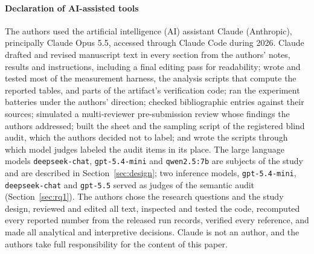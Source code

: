 \paragraph{Declaration of AI-assisted tools}
The authors used the artificial intelligence (AI) assistant Claude (Anthropic), principally Claude Opus 5.5, accessed
through Claude Code during 2026. Claude drafted and revised manuscript text in
every section from the authors' notes, results and instructions, including a
final editing pass for readability; wrote and tested most of the measurement
harness, the analysis scripts that compute the reported tables, and parts of
the artifact's verification code; ran the experiment batteries under the
authors' direction; checked bibliographic entries against their sources;
simulated a multi-reviewer pre-submission review whose findings the authors
addressed; built the sheet and the sampling script of the registered blind audit, which
the authors decided not to label; and wrote the scripts through which model
judges labeled the audit items in its place. The large language models
\texttt{deepseek-chat}, \texttt{gpt-5.4-mini} and \texttt{qwen2.5:7b} are
subjects of the study and are described in Section~\ref{sec:design}; two
inference models, \texttt{gpt-5.4-mini}, \texttt{deepseek-chat} and
\texttt{gpt-5.5} served as judges of the semantic audit
(Section~\ref{sec:rq1}). The authors chose the research
questions and the study design, reviewed and edited all text, inspected and
tested the code, recomputed every reported number from the released run
records, verified every reference, and made all analytical and interpretive
decisions. Claude is not an author, and the authors take full responsibility
for the content of this paper.

